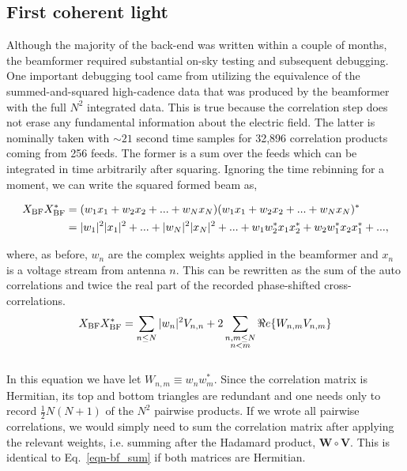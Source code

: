 \subsection{First coherent light}
Although the majority of the back-end was written within a couple  
of months, the beamformer required substantial 
on-sky testing and subsequent debugging. One important debugging tool 
came from utilizing the equivalence of the summed-and-squared
high-cadence data that was produced by the beamformer with the 
full $N^2$ integrated data. This is true because the correlation 
step does not erase any fundamental information about the electric field. 
The latter is nominally taken with $\sim21$ second
time samples for 32,896 correlation products coming from 256 feeds. 
The former is a sum over the feeds which can be integrated in time 
arbitrarily after squaring. Ignoring the time rebinning for a moment,
we can write the squared formed beam as,

\begin{align}
X_{\rm BF} X_{\rm BF}^* &= (w_1 x_1 + w_2 x_2 + ... + w_N x_N) (w_1 x_1 + w_2 x_2 + ... + w_N x_N)^*\\
&= |w_1|^2|x_1|^2 + ... + |w_N|^2|x_N|^2 + ... + w_1 w_2^* x_1 x_2^* + w_2 w_1^* x_2 x_1^* + ... , 
\end{align}

\noindent where, as before, $w_n$ are the 
complex weights applied in the beamformer 
and $x_n$ is a voltage stream from antenna $n$.
This can be rewritten as the sum of the 
auto correlations and twice the real part of the recorded 
phase-shifted cross-correlations.
\\

\begin{equation}
\label{eqn-bf_sum}
X_{\rm BF} X_{\rm BF}^* = \sum_{n\le N} |w_n|^2 V_{n, n} + 
2 \sum_{\substack{n,m\le N \\ n<m}} \Re e\{W_{n, m} V_{n, m}\}
\end{equation}
\\

In this equation we have let $W_{n, m} \equiv w_n w_m^*$.
Since the correlation matrix is Hermitian, its top 
and bottom triangles are redundant and one needs only to 
record $\frac{1}{2} N (N+1)$ of the $N^2$ pairwise products.
If we wrote all pairwise correlations, we would simply need 
to sum the correlation matrix after applying the relevant 
weights, i.e. summing after the Hadamard
product, $\mathbf{W} \circ \mathbf{V}$. This is identical 
to Eq.~\ref{eqn-bf_sum} if both matrices are Hermitian. 

